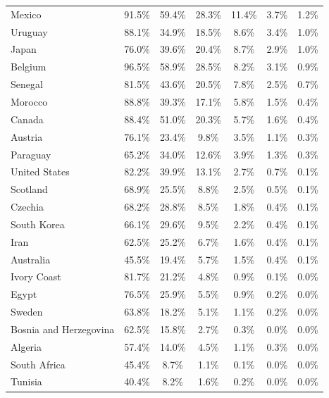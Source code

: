 \documentclass[11pt,letterpaper]{article}
\begin{document}
\begin{table}[p]
\begin{footnotesize}
\begin{threeparttable}
{\begin{tabular*}{\textwidth}{@{\extracolsep{\fill}} lcccccc}
Mexico                 & 91.5\% & 59.4\% & 28.3\% & 11.4\% &  3.7\% &  1.2\% \\
Uruguay                & 88.1\% & 34.9\% & 18.5\% &  8.6\% &  3.4\% &  1.0\% \\
Japan                  & 76.0\% & 39.6\% & 20.4\% &  8.7\% &  2.9\% &  1.0\% \\
Belgium                & 96.5\% & 58.9\% & 28.5\% &  8.2\% &  3.1\% &  0.9\% \\
Senegal                & 81.5\% & 43.6\% & 20.5\% &  7.8\% &  2.5\% &  0.7\% \\
Morocco                & 88.8\% & 39.3\% & 17.1\% &  5.8\% &  1.5\% &  0.4\% \\
Canada                 & 88.4\% & 51.0\% & 20.3\% &  5.7\% &  1.6\% &  0.4\% \\
Austria                & 76.1\% & 23.4\% &  9.8\% &  3.5\% &  1.1\% &  0.3\% \\
Paraguay               & 65.2\% & 34.0\% & 12.6\% &  3.9\% &  1.3\% &  0.3\% \\
United States          & 82.2\% & 39.9\% & 13.1\% &  2.7\% &  0.7\% &  0.1\% \\
Scotland               & 68.9\% & 25.5\% &  8.8\% &  2.5\% &  0.5\% &  0.1\% \\
Czechia                & 68.2\% & 28.8\% &  8.5\% &  1.8\% &  0.4\% &  0.1\% \\
South Korea            & 66.1\% & 29.6\% &  9.5\% &  2.2\% &  0.4\% &  0.1\% \\
Iran                   & 62.5\% & 25.2\% &  6.7\% &  1.6\% &  0.4\% &  0.1\% \\
Australia              & 45.5\% & 19.4\% &  5.7\% &  1.5\% &  0.4\% &  0.1\% \\
Ivory Coast            & 81.7\% & 21.2\% &  4.8\% &  0.9\% &  0.1\% &  0.0\% \\
Egypt                  & 76.5\% & 25.9\% &  5.5\% &  0.9\% &  0.2\% &  0.0\% \\
Sweden                 & 63.8\% & 18.2\% &  5.1\% &  1.1\% &  0.2\% &  0.0\% \\
Bosnia and Herzegovina & 62.5\% & 15.8\% &  2.7\% &  0.3\% &  0.0\% &  0.0\% \\
Algeria                & 57.4\% & 14.0\% &  4.5\% &  1.1\% &  0.3\% &  0.0\% \\
South Africa           & 45.4\% &  8.7\% &  1.1\% &  0.1\% &  0.0\% &  0.0\% \\
Tunisia                & 40.4\% &  8.2\% &  1.6\% &  0.2\% &  0.0\% &  0.0\% \\

\end{tabular*}}
\end{threeparttable}
\end{footnotesize}
\end{table}
\end{document}
